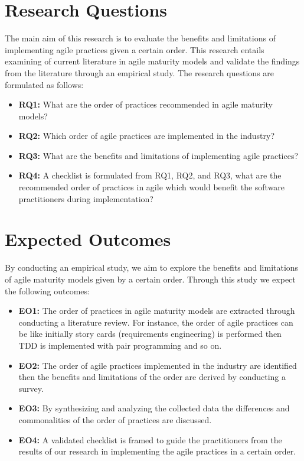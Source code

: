 \documentclass[a4paper,oneside]{bth}
\begin{document}
\section{Research Questions}
The main aim of this research is to evaluate the benefits and limitations of implementing agile practices given a certain order. This research entails examining of current literature in agile maturity models and validate the findings from the literature through an empirical study. 
The research questions are formulated as follows:
\begin{itemize}
\item \textbf{RQ1:} What are the order of practices recommended in agile maturity models?
\item \textbf{RQ2:} Which order of agile practices are implemented in the industry?
\item \textbf{RQ3:} What are the benefits and limitations of implementing agile practices?
\item \textbf{RQ4:} A checklist is formulated from RQ1, RQ2, and RQ3, what are the recommended order of practices in agile which would benefit the software practitioners during implementation?
\end{itemize}
\section{Expected Outcomes}
By conducting an empirical study, we aim to explore the benefits and limitations of agile maturity models given by a certain order. Through this study we expect the following outcomes:
\begin{itemize}
\item \textbf{EO1:} The order of practices in agile maturity models are extracted through conducting a literature review. For instance, the order of agile practices can be like initially story cards (requirements engineering) is performed then TDD is implemented with pair programming and so on.
\item \textbf{EO2:} The order of agile practices implemented in the industry are identified then the benefits and limitations of the order are derived by conducting a survey.
\item \textbf{EO3:} By synthesizing and analyzing the collected data the differences and commonalities of the order of practices are discussed.
\item \textbf{EO4:} A validated checklist is framed to guide the practitioners from the results of our research in implementing the agile practices in a certain order.
\end{itemize}
\end{document}
